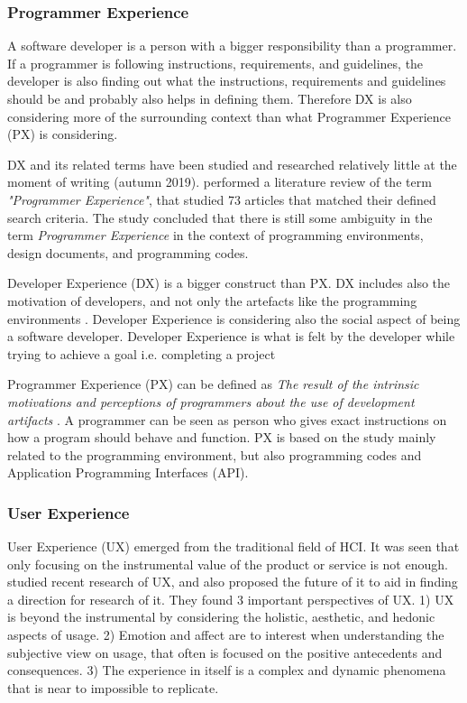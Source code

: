 \documentclass[english, 12pt, a4paper, sci, utf8, a-1b, online]{aaltothesis}
\newcommand{\now}{autumn 2019}
\begin{document}
\subsubsection{Programmer Experience}

A software developer is a person with a bigger responsibility than a programmer. If a programmer is following instructions, requirements, and guidelines, the developer is also finding out what the instructions, requirements and guidelines should be and probably also helps in defining them. Therefore DX is also considering more of the surrounding context than what Programmer Experience (PX) is considering.

DX and its related terms have been studied and researched relatively little at the moment of writing (\now). \cite{programmer-experience} performed a literature review of the term \textit{"Programmer Experience"}, that studied 73 articles that matched their defined search criteria. The study concluded that there is still some ambiguity in the term \textit{Programmer Experience} in the context of programming environments, design documents, and programming codes.

Developer Experience (DX) is a bigger construct than PX. DX includes also the motivation of developers, and not only the artefacts like the programming environments \citep{programmer-experience}. Developer Experience is considering also the social aspect of being a software developer. Developer Experience is what is felt by the developer while trying to achieve a goal i.e. completing a project

Programmer Experience (PX) can be defined as \textit{The result of the intrinsic motivations and perceptions of programmers about the use of development artifacts} \citep{programmer-experience}. A programmer can be seen as person who gives exact instructions on how a program should behave and function. PX is based on the study mainly related to the programming environment, but also programming codes and Application Programming Interfaces (API).


\subsubsection{User Experience} \label{section:ux}

User Experience (UX) emerged from the traditional field of HCI. It was seen that only focusing on the instrumental value of the product or service is not enough. \cite{ux-research-agenda} studied recent research of UX, and also proposed the future of it to aid in finding a direction for research of it. They found 3 important perspectives of UX. 1) UX is beyond the instrumental by considering the holistic, aesthetic, and hedonic aspects of usage. 2) Emotion and affect are to interest when understanding the subjective view on usage, that often is focused on the positive antecedents and consequences. 3) The experience in itself is a complex and dynamic phenomena that is near to impossible to replicate.
\end{document}
